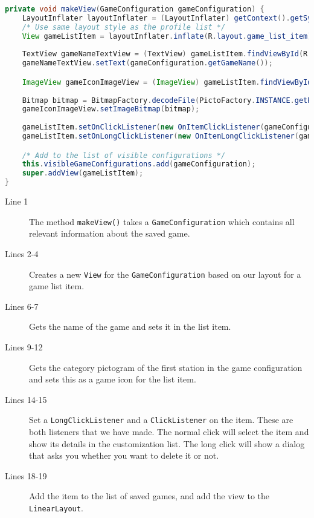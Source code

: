 \begin{lstlisting}[language=java,firstnumber=1,caption={The method to create a list item.},label=lst:makeview]
private void makeView(GameConfiguration gameConfiguration) {
    LayoutInflater layoutInflater = (LayoutInflater) getContext().getSystemService(Context.LAYOUT_INFLATER_SERVICE);
    /* Use same layout style as the profile list */
    View gameListItem = layoutInflater.inflate(R.layout.game_list_item);
    
    TextView gameNameTextView = (TextView) gameListItem.findViewById(R.id.gameName);
    gameNameTextView.setText(gameConfiguration.getGameName());

    ImageView gameIconImageView = (ImageView) gameListItem.findViewById(R.id.gameIcon);
    
    Bitmap bitmap = BitmapFactory.decodeFile(PictoFactory.INSTANCE.getPictogram(super.getContext(),gameConfiguration.getStation(0).getCategory()).getImagePath());
    gameIconImageView.setImageBitmap(bitmap);
    
    gameListItem.setOnClickListener(new OnItemClickListener(gameConfiguration));
    gameListItem.setOnLongClickListener(new OnItemLongClickListener(gameConfiguration));

    /* Add to the list of visible configurations */
    this.visibleGameConfigurations.add(gameConfiguration);
    super.addView(gameListItem);
}
\end{lstlisting}
\begin{description}
\item[Line 1] The method \lstinline|makeView()| takes a \lstinline|GameConfiguration| which contains all relevant information about the saved game.
\item[Lines 2-4] Creates a new \lstinline|View| for the \lstinline|GameConfiguration| based on our layout for a game list item.
\item[Lines 6-7] Gets the name of the game and sets it in the list item.
\item[Lines 9-12] Gets the category pictogram of the first station in the game configuration and sets this as a game icon for the list item.
\item[Lines 14-15] Set a \lstinline|LongClickListener| and a \lstinline|ClickListener| on the item. These are both listeners that we have made. The normal click will select the item and show its details in the customization list. The long click will show a dialog that asks you whether you want to delete it or not.
\item[Lines 18-19] Add the item to the list of saved games, and add the view to the \lstinline|LinearLayout|.
\end{description}
